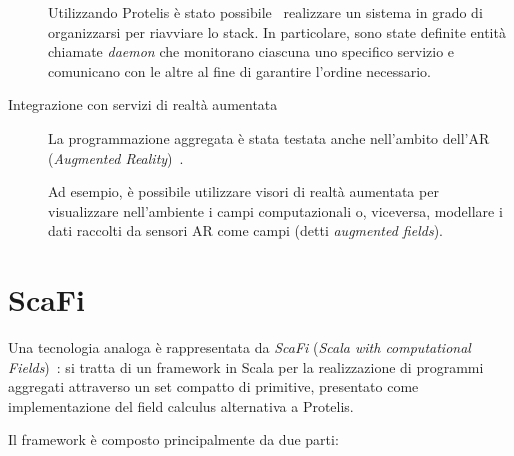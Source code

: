 \begin{description}
    Utilizzando Protelis è stato possibile~\cite{7306601} realizzare un sistema in grado di organizzarsi per riavviare lo stack.
    In particolare, sono state definite entità chiamate \emph{daemon} che monitorano ciascuna uno specifico servizio e comunicano con le altre al fine di garantire l'ordine necessario.

  \item[Integrazione con servizi di realtà aumentata]
    La programmazione aggregata è stata testata anche nell'ambito dell'AR (\emph{Augmented Reality})~\cite{PCRV-SCOPES2015}.

    Ad esempio, è possibile utilizzare visori di realtà aumentata per visualizzare nell'ambiente i campi computazionali
    o, viceversa, modellare i dati raccolti da sensori AR come campi (detti \emph{augmented fields}).
\end{description}


\section{ScaFi}\label{sec:scafi}

Una tecnologia analoga è rappresentata da \emph{ScaFi} (\emph{\emph{Sca}la with computational \emph{Fi}elds})~\cite{aggregatescala-pmldc2016}:
si tratta di un framework in Scala per la realizzazione di programmi aggregati attraverso un set compatto di primitive, presentato come implementazione del field calculus alternativa a Protelis.

Il framework è composto principalmente da due parti:


